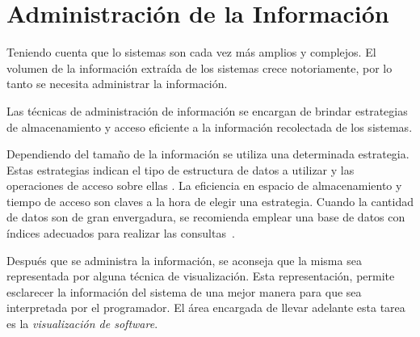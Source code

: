 

\enlargethispage{\baselineskip}%
\section{Administración de la Información}

Teniendo cuenta que lo sistemas son cada vez más amplios y complejos. El volumen de la información extraída de los sistemas crece notoriamente, por lo tanto se necesita administrar la información.

Las técnicas de administración de información se encargan de brindar estrategias de almacenamiento y acceso eficiente a la información recolectada de los sistemas. 

Dependiendo del tamaño de la información se utiliza una determinada estrategia. Estas estrategias indican el tipo de estructura de datos a utilizar y las operaciones de acceso sobre ellas \cite{AAJU83,TSTA80}. La eficiencia en espacio de almacenamiento y tiempo de acceso son claves a la hora de elegir una estrategia.
Cuando la cantidad de datos son de gran envergadura, se recomienda emplear una base de datos con índices adecuados para realizar las \mbox{consultas \cite{ERNS99}.}

Después que se administra la información, se aconseja que la misma sea representada por alguna técnica de visualización. Esta representación, permite esclarecer la información del sistema de una mejor manera para que sea interpretada por el programador. El área encargada de llevar adelante esta tarea es la \textit{visualización de software}.

